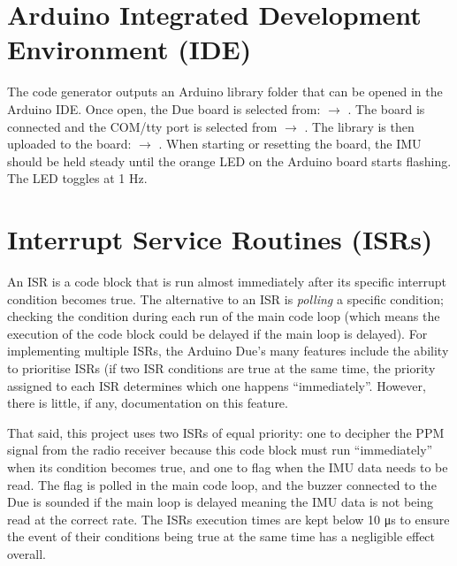 \section{Arduino Integrated Development Environment (IDE)}
The code generator outputs an Arduino library folder that can be opened in the Arduino \ac{IDE}. Once open, the Due board is selected from:  $\rightarrow$ . The board is connected and the COM/tty port is selected from  $\rightarrow$ . The library is then uploaded to the board:  $\rightarrow$ . When starting or resetting the board, the \ac{IMU} should be held steady until the orange LED on the Arduino board starts flashing. The LED toggles at 1 \si{\hertz}.








\section{Interrupt Service Routines (ISRs)}
An ISR is a code block that is run almost immediately after its specific interrupt condition becomes true. The alternative to an ISR is \textit{polling} a specific condition; checking the condition during each run of the main code loop (which means the execution of the code block could be delayed if the main loop is delayed). For implementing multiple ISRs, the Arduino Due's many features include the ability to prioritise ISRs (if two ISR conditions are true at the same time, the priority assigned to each ISR determines which one happens ``immediately''. However, there is little, if any, documentation on this feature.

That said, this project uses two ISRs of equal priority: one to decipher the \ac{PPM} signal from the radio receiver because this code block must run ``immediately'' when its condition becomes true, and one to flag when the \ac{IMU} data needs to be read. The flag is polled in the main code loop, and the buzzer connected to the Due is sounded if the main loop is delayed meaning the IMU data is not being read at the correct rate. The ISRs execution times are kept below 10 \si{\micro\second} to ensure the event of their conditions being true at the same time has a negligible effect overall.
